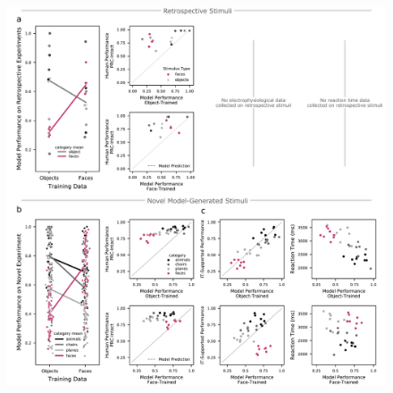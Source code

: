 \documentclass[11pt]{article}
\begin{document}
\begin{figure}[ht]
\centering
\includegraphics[width=.85\linewidth]{figures/F7}

\end{figure}
\end{document}
